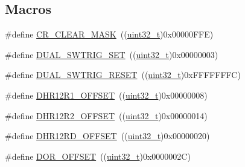 \subsection*{Macros}
\begin{DoxyCompactItemize}
\item 
\#define \hyperlink{group___d_a_c___private___defines_ga8a5812a1d5ced986bb997a4bb7ae697d}{C\+R\+\_\+\+C\+L\+E\+A\+R\+\_\+\+M\+A\+SK}~((\hyperlink{_p_e___types_8h_a33594304e786b158f3fb30289278f5af}{uint32\+\_\+t})0x00000\+F\+F\+E)
\item 
\#define \hyperlink{group___d_a_c___private___defines_ga6401668f65168b2b689b49155f380bdd}{D\+U\+A\+L\+\_\+\+S\+W\+T\+R\+I\+G\+\_\+\+S\+ET}~((\hyperlink{_p_e___types_8h_a33594304e786b158f3fb30289278f5af}{uint32\+\_\+t})0x00000003)
\item 
\#define \hyperlink{group___d_a_c___private___defines_gacd3ce00f8b25892532af267f26932ed7}{D\+U\+A\+L\+\_\+\+S\+W\+T\+R\+I\+G\+\_\+\+R\+E\+S\+ET}~((\hyperlink{_p_e___types_8h_a33594304e786b158f3fb30289278f5af}{uint32\+\_\+t})0x\+F\+F\+F\+F\+F\+F\+F\+C)
\item 
\#define \hyperlink{group___d_a_c___private___defines_gaf1305e3b7cfb0f898678baeab6e91cbf}{D\+H\+R12\+R1\+\_\+\+O\+F\+F\+S\+ET}~((\hyperlink{_p_e___types_8h_a33594304e786b158f3fb30289278f5af}{uint32\+\_\+t})0x00000008)
\item 
\#define \hyperlink{group___d_a_c___private___defines_ga157b0fbccea090637eea09172fdd6a39}{D\+H\+R12\+R2\+\_\+\+O\+F\+F\+S\+ET}~((\hyperlink{_p_e___types_8h_a33594304e786b158f3fb30289278f5af}{uint32\+\_\+t})0x00000014)
\item 
\#define \hyperlink{group___d_a_c___private___defines_ga2893b0491ec29a95fd061e5e0fa029e3}{D\+H\+R12\+R\+D\+\_\+\+O\+F\+F\+S\+ET}~((\hyperlink{_p_e___types_8h_a33594304e786b158f3fb30289278f5af}{uint32\+\_\+t})0x00000020)
\item 
\#define \hyperlink{group___d_a_c___private___defines_ga051bab7263211bd232d13665339c1745}{D\+O\+R\+\_\+\+O\+F\+F\+S\+ET}~((\hyperlink{_p_e___types_8h_a33594304e786b158f3fb30289278f5af}{uint32\+\_\+t})0x0000002\+C)
\end{DoxyCompactItemize}
